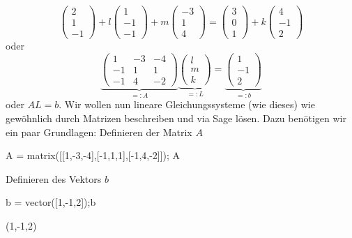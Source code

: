 \documentclass[fontsize=12pt,paper=a4,twoside,bibtotoc,idxtotoc,
liststotoc,pagesize,BCOR1.2cm,DIV15,chapterprefix,pagesize=pdftex]{scrbook}
\theoremstyle{plain}
\theoremstyle{definition}
\theoremstyle{remark}
\begin{document}
\[ 
\left ( \begin{array}{c}  2 \\ 1 \\ -1 \end{array} \right) +l 
\left ( \begin{array}{c}  1 \\ -1 \\ -1 \end{array} \right) +m
\left ( \begin{array}{c}  -3 \\ 1 \\ 4 \end{array} \right) = \left ( \begin{array}{c}  3 \\ 0 \\ 1 \end{array} \right) +k
\left ( \begin{array}{c}  4 \\ -1 \\ 2 \end{array} \right)
\] oder {
\[ 
\underbrace{\left(   
\begin{array} {ccc} 
1 & -3 & -4\\
-1 & 1 & 1 \\
-1 & 4 & -2  
\end{array} \right)}_{\displaystyle =:A} 
\underbrace{\left ( \begin{array}{c}  l \\ m \\ k \end{array}
  \right)}_{\displaystyle =:L} = \underbrace{\left ( \begin{array}{c}  1 \\ -1 \\ 2
  \end{array} \right)}_{\displaystyle =:b}
\] }
oder $A L=b$.
Wir wollen nun lineare Gleichungssysteme (wie dieses) wie gewöhnlich durch Matrizen beschreiben und via Sage lösen. Dazu benötigen wir ein paar Grundlagen:
 Definieren der Matrix $A$
\begin{sagein}
A = matrix([[1,-3,-4],[-1,1,1],[-1,4,-2]]); A
\end{sagein}
\begin{sageout}
[ 1 -3 -4]
[-1  1  1]
[-1  4 -2]
\end{sageout}
 Definieren des Vektors $b$
\begin{sagein}
b = vector([1,-1,2]);b
\end{sagein}
\begin{sageout}
(1,-1,2) 
\end{sageout}
\end{document}
